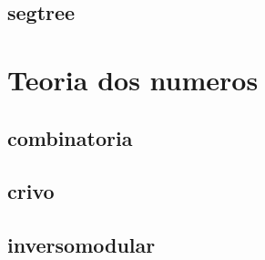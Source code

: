 \subsection{segtree}
\raggedbottom
\hrulefill

\section{Teoria dos numeros}
\subsection{combinatoria}
\raggedbottom
\hrulefill
\subsection{crivo}
\raggedbottom
\hrulefill
\subsection{inversomodular}
\raggedbottom
\hrulefill

